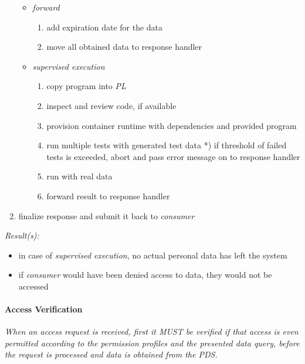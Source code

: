 \documentclass[12pt,english,a4paper,titlepage,cleardoublepage=empty,dottedtoc]{report}
\providecommand{\tightlist}{%
  \setlength{\itemsep}{0pt}\setlength{\parskip}{0pt}}
\begin{document}
\begin{enumerate}
  \begin{itemize}
  \tightlist
  \item
    \emph{forward}

    \begin{enumerate}
    \def\labelenumii{\arabic{enumii})}
    \tightlist
    \item
      add expiration date for the data
    \item
      move all obtained data to response handler
    \end{enumerate}
  \item
    \emph{supervised execution}

    \begin{enumerate}
    \def\labelenumii{\arabic{enumii})}
    \setcounter{enumii}{-1}
    \tightlist
    \item
      copy program into \emph{PL}
    \item
      inspect and review code, if available
    \item
      provision container runtime with dependencies and provided program
    \item
      run multiple tests with generated test data *) if threshold of
      failed tests is exceeded, abort and pass error message on to
      response handler
    \item
      run with real data
    \item
      forward result to response handler
    \end{enumerate}
  \end{itemize}
\item
  finalize response and submit it back to \emph{consumer}
\end{enumerate}

\emph{Result(s):}

\begin{itemize}
\tightlist
\item
  in case of \emph{supervised execution}, no actual personal data has
  left the system
\item
  if \emph{consumer} would have been denied access to data, they would
  not be accessed
\end{itemize}

\hypertarget{access-verification}{\paragraph{Access
Verification}\label{access-verification}}

\emph{When an access request is received, first it MUST be verified if
that access is even permitted according to the permission profiles and
the presented data query, before the request is processed and data is
obtained from the PDS.}
\end{document}
